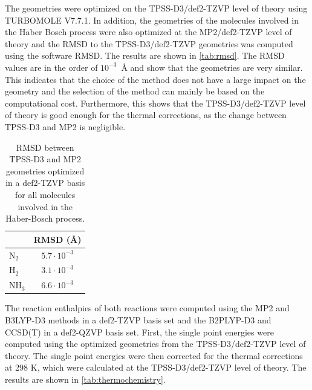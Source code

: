 \documentclass[fontsize=11pt,a4paper,oneside]{scrartcl}
\begin{document}
\begin{center}

\end{center}

The geometries were optimized on the \ac{TPSS}\autocite{Tao2003}-D3\autocite{Grimme2010}/def2-TZVP\autocite{Hellweg2014} level of theory using TURBOMOLE V7.7.1\autocite{Turbomole2007}. In addition, the geometries of the molecules involved in the Haber Bosch process were also optimized at the \ac{MP2}\autocite{Moller1934}/def2-TZVP level of theory and the RMSD to the \ac{TPSS}-D3/def2-TZVP geometries was computed using the software RMSD\autocite{Coutsias2004}. The results are shown in \autoref{tab:rmsd}. The RMSD values are in the order of $10^{-3}$~\AA{} and show that the geometries are very similar. This indicates that the choice of the method does not have a large impact on the geometry and the selection of the method can mainly be based on the computational cost. Furthermore, this shows that the \ac{TPSS}-D3/def2-TZVP level of theory is good enough for the thermal corrections, as the change between \ac{TPSS}-D3 and \ac{MP2} is negligible.

\begin{table}[htbp]
    \centering
    \caption{RMSD between \ac{TPSS}-D3 and \ac{MP2} geometries optimized in a def2-TZVP basis for all molecules involved in the Haber-Bosch process.}
    \label{tab:rmsd}
        \begin{tabular}{@{}lc@{}} \toprule
        & RMSD (\AA) \\ \midrule
        N$_2$ & $5.7 \cdot 10^{-3}$ \\
        H$_2$ & $3.1 \cdot 10^{-3}$ \\
        NH$_3$ & $6.6 \cdot 10^{-3}$ \\ \bottomrule
        \end{tabular}
\end{table}

The reaction enthalpies of both reactions were computed using the \ac{MP2} and \ac{B3LYP}\autocite{Becke1993,Lee1988}-D3\autocite{Grimme2010} methods in a def2-TZVP basis set and the \ac{B2PLYP}\autocite{Grimme2006}-D3\autocite{Grimme2010} and \ac{CCSD(T)} in a def2-QZVP\autocite{Hellweg2014} basis set. First, the single point energies were computed using the optimized geometries from the \ac{TPSS}-D3/def2-TZVP level of theory. The single point energies were then corrected for the thermal corrections at 298 K, which were calculated at the \ac{TPSS}-D3/def2-TZVP level of theory. The results are shown in \autoref{tab:thermochemistry}.
\end{document}
